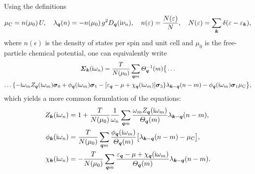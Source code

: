 Using the definitions \cite{MargineGiustino13}
%
\begin{equation} \label{coupling strengths}
    \mu \sb{\text{C}} = n(\mu_0) \, U,
        \quad
    \lambda_{\boldsymbol q}(n) = -n(\mu_0) \, g^2 D_{\boldsymbol q}(\mathrm i \nu_n),
        \quad
    n(\varepsilon) = \frac{N(\varepsilon)} N,
        \quad
    N(\varepsilon) = \sum_{\boldsymbol k} \delta(\varepsilon - \varepsilon_{\boldsymbol k}),
\end{equation}
%
where $n(\epsilon)$ is the density of states per spin and unit cell and $\mu_0$
is the free-particle chemical potential, one can equivalently write
%
\begin{multline*}
    \boldsymbol {\varSigma}_{\boldsymbol k} (\mathrm i \omega_n)
    = \frac T {N(\mu_0)} \sum_{\boldsymbol q m}
    \varTheta_{\boldsymbol q}^{-1}(m) \big \{ \dots
        \\
        \dots \{
            - \mathrm i \omega_m Z_{\boldsymbol q}(\mathrm i \omega_m) \boldsymbol \sigma_0
            + \phi_{\boldsymbol q}(\mathrm i \omega_m) \boldsymbol \sigma_1
            - [\varepsilon_{\boldsymbol q} - \mu + \chi_{\boldsymbol q}(\mathrm i \omega_m)]
            \boldsymbol \sigma_3
            \}
        \lambda_{\boldsymbol k - \boldsymbol q}(n - m)
        - \phi_{\boldsymbol q}(\mathrm i \omega_m) \boldsymbol \sigma_1 \mu \sb{\text{C}}
    \big \},
\end{multline*}
%
which yields a more common formulation of the  equations:
%
\begin{subequations} \label{Eliashberg equations}
    \begin{align}
        Z_{\boldsymbol k}(\mathrm i \omega_n) &= 1 + \frac T {N(\mu_0)} \frac 1 {\omega_n}
        \sum_{\boldsymbol q m} \frac
            {\omega_m Z_{\boldsymbol q}(\mathrm i \omega_m)}
            {\varTheta_{\boldsymbol q}(m)}
        \lambda_{\boldsymbol k - \boldsymbol q}(n - m),
        \\
        \phi_{\boldsymbol k}(\mathrm i \omega_n) &= \frac T {N(\mu_0)}
        \sum_{\boldsymbol q m} \frac
            {\phi_{\boldsymbol q}(\mathrm i \omega_m)}
            {\varTheta_{\boldsymbol q}(m)}
        \big[
            \lambda_{\boldsymbol k - \boldsymbol q}(n - m) - \mu \sb{\text{C}}
        \big],
        \\
        \chi_{\boldsymbol k}(\mathrm i \omega_n) &= -\frac T {N(\mu_0)}
        \sum_{\boldsymbol q m} \frac
            {\varepsilon_{\boldsymbol q} - \mu + \chi_{\boldsymbol q}(\mathrm i \omega_m)}
            {\varTheta_{\boldsymbol q}(m)}
        \lambda_{\boldsymbol k - \boldsymbol q}(n - m).
    \end{align}
\end{subequations}

